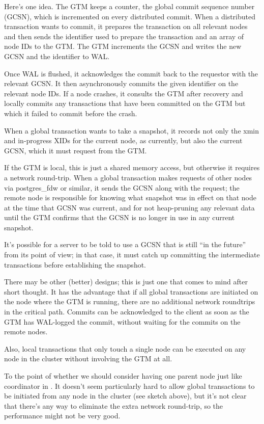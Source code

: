 	Here's one idea.
	The GTM keeps a counter, the global commit sequence number (GCSN), which is
	incremented on every distributed commit.
	When a distributed transaction wants to commit, it prepares the transaction
	on all relevant nodes and then sends the identifier used to prepare the
	transaction and an array of node IDs to the GTM.
	The GTM increments the GCSN and writes the new GCSN and the identifier to WAL.

	Once WAL is flushed, it acknowledges the commit back to the requestor with the
	relevant GCSN.
	It then asynchronously commits the given identifier on the relevant node IDs.
	If a node crashes, it consults the GTM after recovery and locally commits any
	transactions that have been committed on the GTM but which it failed to commit
	before the crash. 

	When a global transaction wants to take a snapshot, it records not only the
	xmin and in-progress XIDs for the current node, as currently, but also the
	current GCSN, which it must request from the GTM. 

	If the GTM is local, this is just a shared memory access, but otherwise it
	requires a network round-trip. When a global transaction makes requests of
	other nodes via postgres\_fdw or similar, it sends the GCSN along with the request;
	the remote node is responsible for knowing what snapshot was in effect on that
	node at the time that GCSN was current, and for not heap-pruning any relevant
	data until the GTM confirms that the GCSN is no longer in use in any current snapshot.

	It's possible for a server to be told to use a GCSN that is still ``in the future''
	from its point of view;
	in that case, it must catch up committing the intermediate transactions before
	establishing the snapshot.
	
	There may be other (better) designs; this is just one that comes to mind after
	short thought.
	It has the advantage that if all global transactions are initiated on the node
	where the GTM is running, there are no additional network roundtrips in
	the critical path.
	Commits can be acknowledged to the client as soon as the GTM has WAL-logged
	the commit, without waiting for the commits on the remote nodes.

	Also, local transactions that only touch a single node can be executed on any
	node in the cluster without involving the GTM at all.

	To the point of whether we should consider having one parent node just like coordinator
	in \XC.
	It doesn't seem particularly hard to allow global transactions to be initiated from any
	node in the cluster (see sketch above), but it's not clear that there's any way to
	eliminate the extra network round-trip, so the performance might not be very good.

